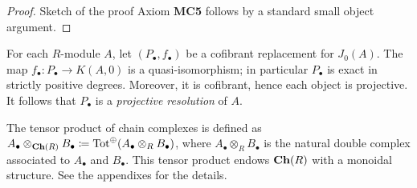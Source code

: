 \begin{refsection}
\begin{proof}{Sketch of the proof}
Axiom {\bfseries MC5} follows by a standard small object argument.
\end{proof}

\begin{eg}
For each $R$-module $A$, let $(P_\bullet,f_\bullet)$ be a cofibrant replacement for $J_0(A)$. The map $f_\bullet \colon P_\bullet \to K(A,0)$ is a quasi-isomorphism; in particular $P_\bullet$ is exact in strictly positive degrees. Moreover, it is cofibrant, hence each object is projective. It follows that $P_\bullet$ is a \emph{projective resolution} of $A$.
\end{eg}

\begin{rmk}
The tensor product of chain complexes is defined as $A_\bullet \otimes_{\mathbf{Ch}(R)} B_\bullet\coloneqq \operatorname{\mathrm{Tot}}^\oplus(A_\bullet \otimes_R B_\bullet)$, where $A_\bullet \otimes_R B_\bullet$ is the natural double complex associated to $A_\bullet$ and $B_\bullet$. This tensor product endows $\mathbf{Ch}(R)$ with a monoidal structure. See the appendixes for the details.
\end{rmk}


\end{refsection}
